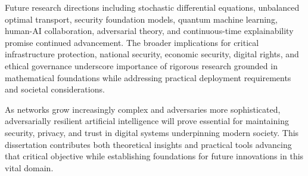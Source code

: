 Future research directions including stochastic differential equations, unbalanced optimal transport, security foundation models, quantum machine learning, human-AI collaboration, adversarial theory, and continuous-time explainability promise continued advancement. The broader implications for critical infrastructure protection, national security, economic security, digital rights, and ethical governance underscore importance of rigorous research grounded in mathematical foundations while addressing practical deployment requirements and societal considerations.

As networks grow increasingly complex and adversaries more sophisticated, adversarially resilient artificial intelligence will prove essential for maintaining security, privacy, and trust in digital systems underpinning modern society. This dissertation contributes both theoretical insights and practical tools advancing that critical objective while establishing foundations for future innovations in this vital domain.
